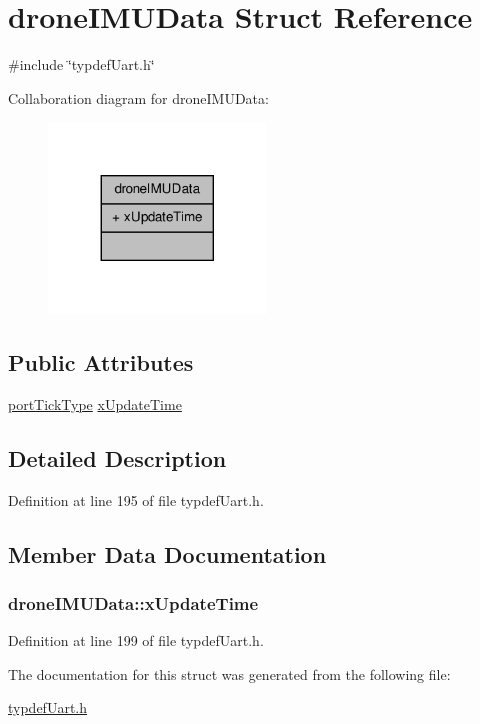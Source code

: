 \hypertarget{structdroneIMUData}{\section{drone\-I\-M\-U\-Data Struct Reference}
\label{structdroneIMUData}
}


{\ttfamily \#include \char`\"{}typdef\-Uart.\-h\char`\"{}}



Collaboration diagram for drone\-I\-M\-U\-Data\-:\nopagebreak
\begin{figure}[H]
\begin{center}
\leavevmode
\includegraphics[width=164pt]{structdroneIMUData__coll__graph}
\end{center}
\end{figure}
\subsection*{Public Attributes}
\begin{DoxyCompactItemize}
\item 
\hyperlink{typdefUart_8h_ae9fa5e001303f1be1c0294f26cde8caf}{port\-Tick\-Type} \hyperlink{structdroneIMUData_a0ae68e4b692508cf64953adcb12443e1}{x\-Update\-Time}
\end{DoxyCompactItemize}


\subsection{Detailed Description}


Definition at line 195 of file typdef\-Uart.\-h.



\subsection{Member Data Documentation}
\hypertarget{structdroneIMUData_a0ae68e4b692508cf64953adcb12443e1}{
\subsubsection[{x\-Update\-Time}]{ drone\-I\-M\-U\-Data\-::x\-Update\-Time}}\label{structdroneIMUData_a0ae68e4b692508cf64953adcb12443e1}


Definition at line 199 of file typdef\-Uart.\-h.



The documentation for this struct was generated from the following file\-:\begin{DoxyCompactItemize}
\item 
\hyperlink{typdefUart_8h}{typdef\-Uart.\-h}\end{DoxyCompactItemize}
